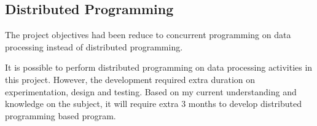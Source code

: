 \subsection{Distributed Programming} 

The project objectives had been reduce to concurrent programming on data processing instead of distributed programming. 

It is possible to perform distributed programming on data processing activities in this project. However, the development required extra duration on experimentation, design and testing. Based on my current understanding and knowledge on the subject, it will require extra 3 months to develop distributed programming based program. 
 











